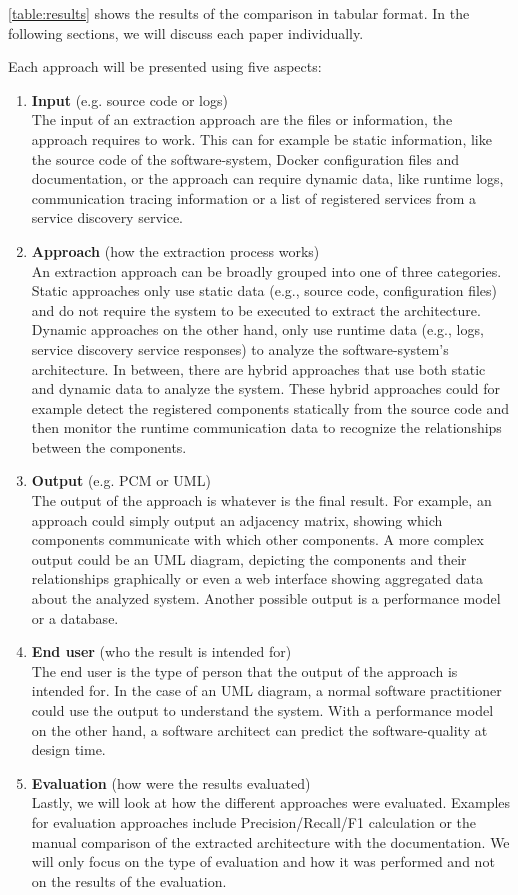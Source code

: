 \autoref{table:results} shows the results of the comparison in tabular format.
In the following sections, we will discuss each paper individually.

Each approach will be presented using five aspects:
\begin{enumerate}
	\item \textbf{Input} (e.g. source code or logs) \\
		  The input of an extraction approach are the files or information, the approach requires to work.
		  This can for example be static information, like the source code of the software-system, Docker configuration files and documentation, or the approach can require dynamic data, like runtime logs, communication tracing information or a list of registered services from a service discovery service.
	\item \textbf{Approach} (how the extraction process works) \\
	      An extraction approach can be broadly grouped into one of three categories.
	      Static approaches only use static data (e.g., source code, configuration files) and do not require the system to be executed to extract the architecture.
	      Dynamic approaches on the other hand, only use runtime data (e.g., logs, service discovery service responses) to analyze the software-system's architecture.
	      In between, there are hybrid approaches that use both static and dynamic data to analyze the system. These hybrid approaches could for example detect the registered components statically from the source code and then monitor the runtime communication data to recognize the relationships between the components.
	\item \textbf{Output} (e.g. PCM or UML) \\
	      The output of the approach is whatever is the final result.
	      For example, an approach could simply output an adjacency matrix, showing which components communicate with which other components.
	      A more complex output could be an UML diagram, depicting the components and their relationships graphically or even a web interface showing aggregated data about the analyzed system.
	      Another possible output is a performance model or a database.
	\item \textbf{End user} (who the result is intended for) \\
		  The end user is the type of person that the output of the approach is intended for.
		  In the case of an UML diagram, a normal software practitioner could use the output to understand the system.
  		  With a performance model on the other hand, a software architect can predict the software-quality at design time.
	\item \textbf{Evaluation} (how were the results evaluated) \\
		  Lastly, we will look at how the different approaches were evaluated.
		  Examples for evaluation approaches include Precision/Recall/F1 calculation or the manual comparison of the extracted architecture with the documentation.
		  We will only focus on the type of evaluation and how it was performed and not on the results of the evaluation.
\end{enumerate}


